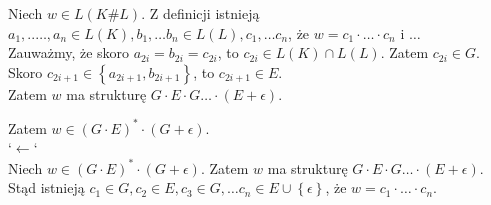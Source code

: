 \documentclass{article}
\theoremstyle{definition}
\theoremstyle{remark}
\begin{document}
Niech \(w \in L(K \# L)\). Z definicji istnieją \(a_1, ..\ldots , a_n \in L(K), b_1, \ldots b_n \in L(L), c_1, \ldots c_n\), że \(w = c_1 \cdot \ldots \cdot c_n\) i \(\ldots\) \\

Zauważmy, że skoro \(a_{2i}=b_{2i}=c_{2i}\), to \(c_{2i} \in L(K) \cap L(L)\). Zatem \(c_{2i} \in G\). \\

Skoro \(c_{2i+1} \in \left\{ a_{2i+1}, b_{2i+1} \right\}\), to \(c_{2i+1} \in E\). \\

Zatem \(w\) ma strukturę \(G \cdot E \cdot G \ldots \cdot \left( E + \epsilon \right)\).

Zatem \(w \in \left( G \cdot E \right)^* \cdot \left( G + \epsilon \right)\). \\

`\( \leftarrow \)` \\

Niech \(w \in \left( G \cdot E \right)^* \cdot \left( G + \epsilon \right)\). Zatem \(w\) ma strukturę \(G \cdot E \cdot G \ldots \cdot \left( E + \epsilon \right)\). 
Stąd istnieją \(c_1 \in G, c_2 \in E, c_3 \in G, \ldots c_n \in E \cup \left\{ \epsilon \right\}\), że \(w = c_1 \cdot \ldots \cdot c_n\). \\
\end{document}
